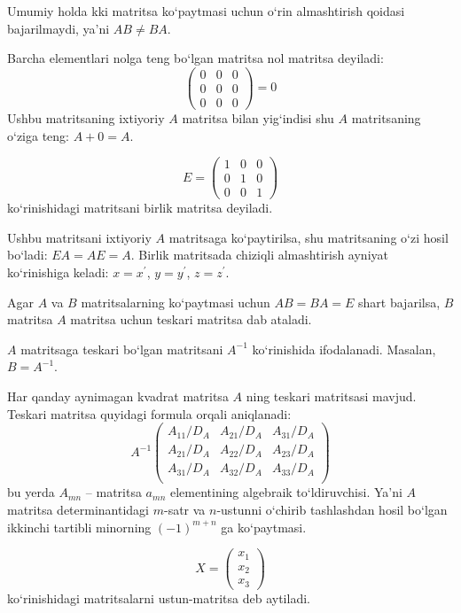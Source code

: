 Umumiy holda kki matritsa ko`paytmasi uchun o`rin almashtirish qoidasi bajarilmaydi, ya'ni $AB\ne BA$. 

Barcha elementlari nolga teng bo`lgan matritsa nol matritsa deyiladi:
$$\begin{pmatrix}
	0&0&0\\
	0&0&0\\
	0&0&0
\end{pmatrix}=0$$
Ushbu matritsaning ixtiyoriy $A$ matritsa bilan yig`indisi shu $A$ matritsaning o`ziga teng: $A+0=A$.

$$E=\begin{pmatrix}
	1&0&0\\
	0&1&0\\
	0&0&1
\end{pmatrix}$$ ko`rinishidagi matritsani birlik matritsa deyiladi.

Ushbu matritsani ixtiyoriy $A$ matritsaga ko`paytirilsa, shu matritsaning o`zi hosil bo`ladi: $EA=AE=A$. Birlik matritsada chiziqli almashtirish ayniyat ko`rinishiga keladi: $x=x^\prime$, $y=y^\prime$, $z=z^\prime$. 

Agar $A$ va $B$ matritsalarning ko`paytmasi uchun $AB=BA=E$ shart bajarilsa, $B$ matritsa $A$ matritsa uchun teskari matritsa dab ataladi.

$A$ matritsaga teskari bo`lgan matritsani $A^{-1}$ ko`rinishida ifodalanadi. Masalan, $B=A^{-1}$.

Har qanday aynimagan kvadrat matritsa $A$ ning teskari matritsasi mavjud. Teskari matritsa quyidagi formula orqali aniqlanadi:
$$A^{-1}\begin{pmatrix}
	A_{11}/D_A&	A_{21}/D_A&	A_{31}/D_A\\
	A_{21}/D_A&	A_{22}/D_A&	A_{23}/D_A\\
	A_{31}/D_A&	A_{32}/D_A&	A_{33}/D_A\\
\end{pmatrix}$$
bu yerda $A_{mn}$ -- matritsa $a_{mn}$ elementining algebraik to`ldiruvchisi. Ya'ni $A$ matritsa determinantidagi $m$-satr va $n$-ustunni o`chirib tashlashdan hosil bo`lgan ikkinchi tartibli minorning $(-1)^{m+n}$ ga ko`paytmasi.

$$X=\begin{pmatrix}
	x_1\\x_2\\x_3
\end{pmatrix}$$
ko`rinishidagi matritsalarni ustun-matritsa deb aytiladi. 

